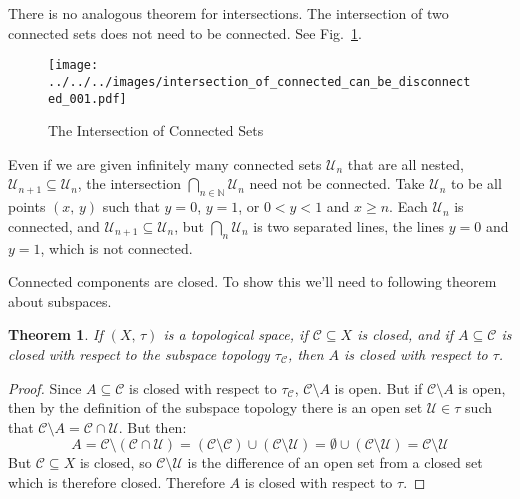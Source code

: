 \documentclass{article}
\theoremstyle{plain}
\newtheorem{theorem}{Theorem}[section]
\theoremstyle{normal}
\begin{document}
        There is no analogous theorem for intersections. The intersection
        of two connected sets does not need to be connected. See
        Fig.~\ref{fig:intersection_of_connected_can_be_disconnected_001}.
        \begin{figure}
            \centering
            \texttt{[image: ../../../images/intersection\_of\_connected\_can\_be\_disconnected\_001.pdf]}
            \caption{The Intersection of Connected Sets}
            \label{fig:intersection_of_connected_can_be_disconnected_001}
        \end{figure}
        Even if we are given infinitely many connected sets
        $\mathcal{U}_{n}$ that are all nested,
        $\mathcal{U}_{n+1}\subseteq\mathcal{U}_{n}$, the intersection
        $\bigcap_{n\in\mathbb{N}}\mathcal{U}_{n}$ need not be connected.
        Take $\mathcal{U}_{n}$ to be all points $(x,\,y)$ such that
        $y=0$, $y=1$, or $0<y<1$ and $x\geq{n}$. Each $\mathcal{U}_{n}$ is
        connected, and $\mathcal{U}_{n+1}\subseteq\mathcal{U}_{n}$, but
        $\bigcap_{n}\mathcal{U}_{n}$ is two separated lines, the lines
        $y=0$ and $y=1$, which is not connected.
        \par\hfill\par
        Connected components are closed. To show this we'll need to following
        theorem about subspaces.
        \begin{theorem}
            If $(X,\,\tau)$ is a topological space, if $\mathcal{C}\subseteq{X}$
            is closed, and if $A\subseteq\mathcal{C}$ is closed with respect
            to the subspace topology $\tau_{\mathcal{C}}$, then $A$ is closed
            with respect to $\tau$.
        \end{theorem}
        \begin{proof}
            Since $A\subseteq\mathcal{C}$ is closed with respect to
            $\tau_{\mathcal{C}}$, $\mathcal{C}\setminus{A}$ is open. But
            if $\mathcal{C}\setminus{A}$ is open, then by the definition of the
            subspace topology there is an open set $\mathcal{U}\in\tau$ such
            that $\mathcal{C}\setminus{A}=\mathcal{C}\cap\mathcal{U}$.
            But then:
            \begin{equation}
                A=\mathcal{C}\setminus(\mathcal{C}\cap\mathcal{U})
                    =(\mathcal{C}\setminus\mathcal{C})
                        \cup(\mathcal{C}\setminus\mathcal{U})
                    =\emptyset\cup(\mathcal{C}\setminus\mathcal{U})
                    =\mathcal{C}\setminus\mathcal{U}
            \end{equation}
            But $\mathcal{C}\subseteq{X}$ is closed, so
            $\mathcal{C}\setminus\mathcal{U}$ is the difference of an open set
            from a closed set which is therefore closed. Therefore $A$ is
            closed with respect to $\tau$.
        \end{proof}
\end{document}
